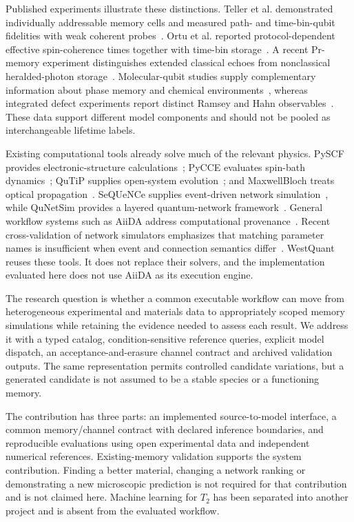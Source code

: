 \documentclass[11pt,a4paper]{article}
\begin{document}
Published experiments illustrate these distinctions. Teller et al. demonstrated individually addressable memory cells and measured path- and time-bin-qubit fidelities with weak coherent probes~\cite{teller}. Ortu et al. reported protocol-dependent effective spin-coherence times together with time-bin storage~\cite{ortu}. A recent Pr-memory experiment distinguishes extended classical echoes from nonclassical heralded-photon storage~\cite{rodriguez}. Molecular-qubit studies supply complementary information about phase memory and chemical environments~\cite{lin,mullin}, whereas integrated defect experiments report distinct Ramsey and Hahn observables~\cite{hu}. These data support different model components and should not be pooled as interchangeable lifetime labels.

Existing computational tools already solve much of the relevant physics. PySCF provides electronic-structure calculations~\cite{pyscf}; PyCCE evaluates spin-bath dynamics~\cite{pycce}; QuTiP supplies open-system evolution~\cite{qutip}; and MaxwellBloch treats optical propagation~\cite{maxwellbloch}. SeQUeNCe supplies event-driven network simulation~\cite{sequence}, while QuNetSim provides a layered quantum-network framework~\cite{qunetsim}. General workflow systems such as AiiDA address computational provenance~\cite{aiida}. Recent cross-validation of network simulators emphasizes that matching parameter names is insufficient when event and connection semantics differ~\cite{chung}. WestQuant reuses these tools. It does not replace their solvers, and the implementation evaluated here does not use AiiDA as its execution engine.

The research question is whether a common executable workflow can move from heterogeneous experimental and materials data to appropriately scoped memory simulations while retaining the evidence needed to assess each result. We address it with a typed catalog, condition-sensitive reference queries, explicit model dispatch, an acceptance-and-erasure channel contract and archived validation outputs. The same representation permits controlled candidate variations, but a generated candidate is not assumed to be a stable species or a functioning memory.

The contribution has three parts: an implemented source-to-model interface, a common memory/channel contract with declared inference boundaries, and reproducible evaluations using open experimental data and independent numerical references. Existing-memory validation supports the system contribution. Finding a better material, changing a network ranking or demonstrating a new microscopic prediction is not required for that contribution and is not claimed here. Machine learning for $T_2$ has been separated into another project and is absent from the evaluated workflow.
\end{document}
